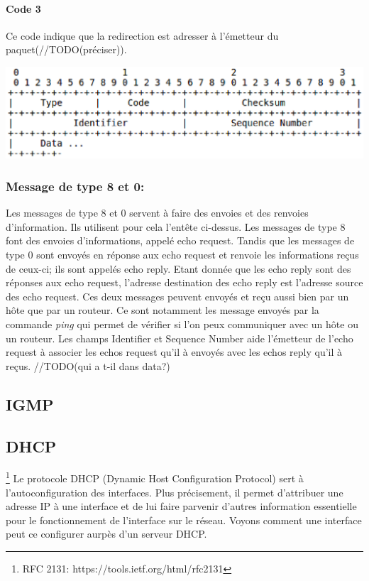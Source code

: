 \paragraph{Code 3} Ce code indique que la redirection est adresser à l'émetteur
du paquet(//TODO(préciser)).

\includegraphics[width=15cm]{./pics/header3.eps}

\subsubsection{Message de type 8 et 0:} Les messages de type 8 et 0 servent à
faire des envoies et des renvoies d'information. Ils utilisent pour cela
l'entête ci-dessus. Les messages de type 8 font des envoies d'informations,
appelé echo request. Tandis que les messages de type 0 sont envoyés en réponse
aux echo request et renvoie les informations reçus de ceux-ci; ils sont appelés
echo reply. Etant donnée que les echo reply sont des réponses aux echo request,
l'adresse destination des echo reply est l'adresse source des echo request. Ces
deux messages peuvent envoyés et reçu aussi bien par un hôte que par un
routeur. Ce sont notamment les message envoyés par la commande {\it ping} qui
permet de vérifier si l'on peux communiquer avec un hôte ou un routeur.  Les
champs Identifier et Sequence Number aide l'émetteur de l'echo request à
associer les echos request qu'il à envoyés avec les echos reply qu'il à reçus.
//TODO(qui a t-il dans data?)

\subsection{IGMP}


\subsection{DHCP} \footnote{RFC 2131: https://tools.ietf.org/html/rfc2131} Le
protocole DHCP (Dynamic Host Configuration Protocol) sert à l'autoconfiguration
des interfaces. Plus précisement, il  permet d'attribuer une adresse IP à une
interface et de lui faire parvenir d'autres information essentielle pour le
fonctionnement de l'interface sur le réseau.  Voyons comment une interface peut
ce configurer aurpès d'un serveur DHCP.

